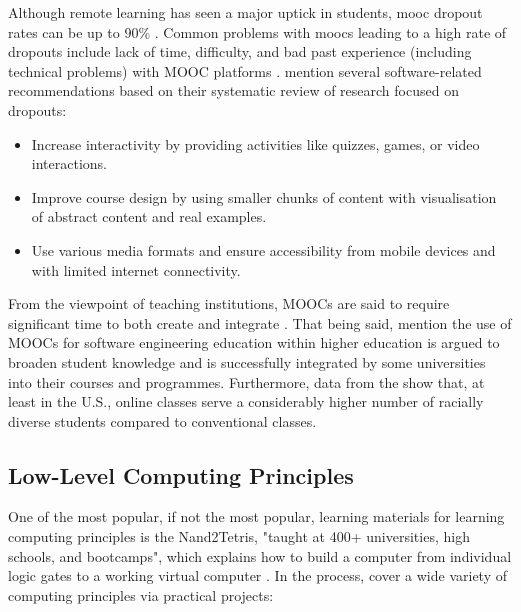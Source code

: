 Although remote learning has seen a major uptick in students, \gls{mooc} dropout rates can be up to 90\% \parencite{goopio_mooc_2021}.
Common problems with \glspl{mooc} leading to a high rate of dropouts include lack of time, difficulty, and bad past experience (including technical problems) with MOOC platforms \parencite{onah2014dropout}.
\textcite{goopio_mooc_2021} mention several software-related recommendations based on their systematic review of research focused on dropouts:

\begin{itemize}
    \item Increase interactivity by providing activities like quizzes, games, or video interactions.
    \item Improve course design by using smaller chunks of content with visualisation of abstract content and real examples.
    \item Use various media formats and ensure accessibility from mobile devices and with limited internet connectivity.
\end{itemize}

From the viewpoint of teaching institutions, MOOCs are said to require significant time to both create and integrate \parencite{stikkolorum2014mooc}.
That being said, \textcite{stikkolorum2014mooc} mention the use of MOOCs for software engineering education within higher education is argued to broaden student knowledge and is successfully integrated by some universities into their courses and programmes.
Furthermore, data from the \textcite{us_doe_digest_2021} show that, at least in the U.S., online classes serve a considerably higher number of racially diverse students compared to conventional classes.

\subsection{Low-Level Computing Principles}
\label{sec:learning-principles}

One of the most popular, if not the most popular, learning materials for learning computing principles is the Nand2Tetris, "taught at 400+ universities, high schools, and bootcamps", which explains how to build a computer from individual logic gates to a working virtual computer \parencite{nand2tetrisweb}.
In the process, \textcite{nand2tetris} cover a wide variety of computing principles via practical projects:


